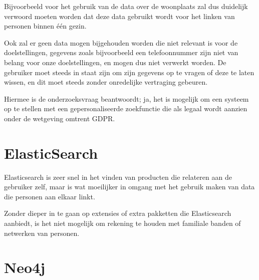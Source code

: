 Bijvoorbeeld voor het gebruik van de data over de woonplaats zal dus duidelijk verwoord moeten worden dat deze data gebruikt wordt voor het linken van personen binnen één gezin.

Ook zal er geen data mogen bijgehouden worden die niet relevant is voor de doelstellingen, gegevens zoals bijvoorbeeld een telefoonnummer zijn niet van belang voor onze doelstellingen, en mogen dus niet verwerkt worden. De gebruiker moet steeds in staat zijn om zijn gegevens op te vragen of deze te laten wissen, en dit moet steeds zonder onredelijke vertraging gebeuren.

Hiermee is de onderzoeksvraag beantwoordt; ja, het is mogelijk om een systeem op te stellen met een gepersonaliseerde zoekfunctie die als legaal wordt aanzien onder de wetgeving omtrent GDPR.

\section{ ElasticSearch}
\label{sec:Conclusie Elasticsearch}

Elasticsearch is zeer snel in het vinden van producten die relateren aan de gebruiker zelf, maar is wat moeilijker in omgang met het gebruik maken van data die personen aan elkaar linkt. 

Zonder dieper in te gaan op extensies of extra pakketten die Elasticsearch aanbiedt, is het niet mogelijk om rekening te houden met familiale banden of netwerken van personen. 



\section{ Neo4j}
\label{sec:Conclusie Neo4j}